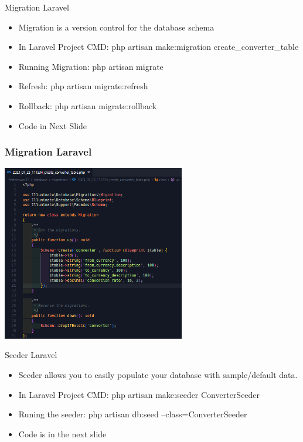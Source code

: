 \documentclass[aspectratio=169, table]{beamer}
\begin{document}
\begin{frame}{Migration Laravel}
    \vskip1cm
    \begin{itemize}
        \item Migration is a version control for the database schema
        \item In Laravel Project CMD: php artisan make:migration create\_converter\_table
        \item Running Migration: php artisan migrate 
        \item Refresh: php artisan migrate:refresh
        \item Rollback: php artisan migrate:rollback
        \item Code in Next Slide
    \end{itemize}
\end{frame}

\begin{frame}[fragile]
 \frametitle{Migration Laravel}
 \vskip1cm
 \begin{center}
  \includegraphics[width=0.6\textwidth]{classFiles/pertemuan-12-migrate.png}
 \end{center}
\end{frame}

\begin{frame}{Seeder Laravel}
    \vskip1cm
    \begin{itemize}
        \item Seeder allows you to easily populate your database with sample/default data.
        \item In Laravel Project CMD: php artisan make:seeder ConverterSeeder
        \item Runing the seeder: php artisan db:seed --class=ConverterSeeder
        \item Code is in the next slide
    \end{itemize}
\end{frame}
\end{document}
